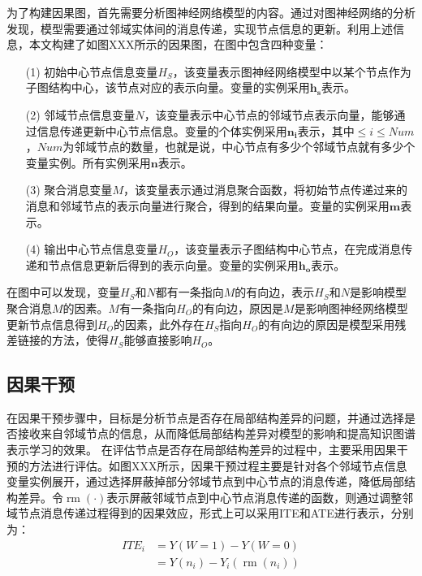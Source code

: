 \documentclass[algorithmlist, AutoFakeBold, AutoFakeSlant, figurelist, tablelist, nomlist, masters]{seuthesix}
\begin{document}
为了构建因果图，首先需要分析图神经网络模型的内容。通过对图神经网络的分析发现，模型需要通过邻域实体间的消息传递，实现节点信息的更新。利用上述信息，本文构建了如图XXX所示的因果图，在图中包含四种变量：
\begin{itemize}
  \item [(1)] 初始中心节点信息变量$H_S$，该变量表示图神经网络模型中以某个节点作为子图结构中心，该节点对应的表示向量。变量的实例采用$\bm{h_s}$表示。
  \item [(2)] 邻域节点信息变量$N$，该变量表示中心节点的邻域节点表示向量，能够通过信息传递更新中心节点信息。变量的个体实例采用$\bm{n_i}$表示，其中$\leq i \leq Num$，$Num$为邻域节点的数量，也就是说，中心节点有多少个邻域节点就有多少个变量实例。所有实例采用$\bm{n}$表示。
  \item [(3)] 聚合消息变量$M$，该变量表示通过消息聚合函数，将初始节点传递过来的消息和邻域节点的表示向量进行聚合，得到的结果向量。变量的实例采用$\bm{m}$表示。
  \item [(4)] 输出中心节点信息变量$H_O$，该变量表示子图结构中心节点，在完成消息传递和节点信息更新后得到的表示向量。变量的实例采用$\bm{h_o}$表示。
\end{itemize}
在图中可以发现，变量$H_S$和$N$都有一条指向$M$的有向边，表示$H_S$和$N$是影响模型聚合消息$M$的因素。$M$有一条指向$H_O$的有向边，原因是$M$是影响图神经网络模型更新节点信息得到$H_O$的因素，此外存在$H_S$指向$H_O$的有向边的原因是模型采用残差链接的方法，使得$H_S$能够直接影响$H_O$。

\subsection{因果干预}
在因果干预步骤中，目标是分析节点是否存在局部结构差异的问题，并通过选择是否接收来自邻域节点的信息，从而降低局部结构差异对模型的影响和提高知识图谱表示学习的效果。
在评估节点是否存在局部结构差异的过程中，主要采用因果干预的方法进行评估。如图XXX所示，因果干预过程主要是针对各个邻域节点信息变量实例展开，通过选择屏蔽掉部分邻域节点到中心节点的消息传递，降低局部结构差异。令$\operatorname{rm}(\cdot)$表示屏蔽邻域节点到中心节点消息传递的函数，则通过调整邻域节点消息传递过程得到的因果效应，形式上可以采用ITE和ATE进行表示，分别为：
\begin{equation}
  \begin{aligned}
    ITE_i & =Y(W=1) - Y(W=0) \\
    & =Y(n_i)-Y_i(\operatorname{rm}(n_i))
  \end{aligned}
  \label{equation_CausalInterventionITE}
\end{equation}
\end{document}
